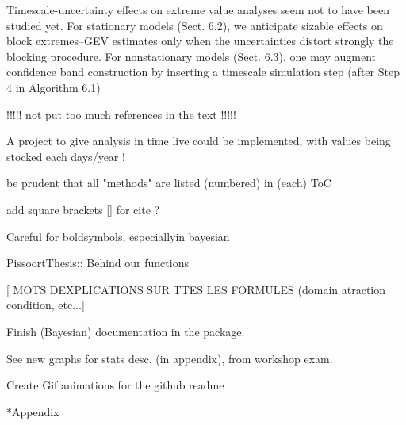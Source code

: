 \documentclass[11pt,a4paper,openany, twosided]{book}
\makeatletter
\renewcommand\part{%
	\if@openright
	\cleardoublepage
	\else
	\clearpage
	\fi
	\thispagestyle{empty}%
	\if@twocolumn
	\onecolumn
	\@tempswatrue
	\else
	\@tempswafalse
	\fi
	\null\vfil
	\secdef\@part\@spart}
\let\origappendix\appendix %
\renewcommand\appendix{\clearpage\pagenumbering{Roman}\origappendix}
\makeatother
\begin{document}
Timescale-uncertainty effects on extreme value analyses seem not to have been
studied yet. For stationary models (Sect. 6.2), we anticipate sizable effects on block
extremes–GEV estimates only when the uncertainties distort strongly the blocking
procedure. For nonstationary models (Sect. 6.3), one may augment confidence band
construction by inserting a timescale simulation step (after Step 4 in Algorithm 6.1) \citet[pp.262]{mudelsee_climate_2014}


!!!!! not put too much references in the text !!!!!

A project to give analysis in time live could be implemented, with values being stocked each days/year !

be prudent that all "methods" are listed (numbered) in (each) ToC

add square brackets [] for cite ? 

Careful for boldsymbols, especiallyin bayesian

PissoortThesis:: Behind our functions 

[ MOTS DEXPLICATIONS SUR TTES LES FORMULES (domain atraction condition, etc...]

\thispagestyle{empty}

Finish (Bayesian) documentation in the package.

See new graphs for stats desc. (in appendix), from workshop exam.

Create Gif animations for the github readme


{}
\part*{Appendix}
\appendix







\setlength{\parindent}{5em}
\setlength{\parskip}{2em}
\renewcommand{\baselinestretch}{4.0}


\end{document}
